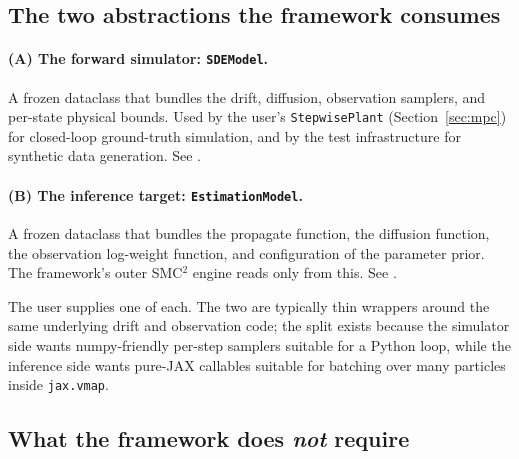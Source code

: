 \subsection{The two abstractions the framework consumes} \label{sec:interfaces}

\paragraph{(A) The forward simulator: \texttt{SDEModel}.}
A frozen dataclass that bundles the drift, diffusion, observation
samplers, and per-state physical bounds. Used by the user's
\texttt{StepwisePlant} (Section~\ref{sec:mpc}) for closed-loop
ground-truth simulation, and by the test infrastructure for synthetic
data generation. See .

\paragraph{(B) The inference target: \texttt{EstimationModel}.}
A frozen dataclass that bundles the propagate function, the diffusion
function, the observation log-weight function, and configuration of
the parameter prior. The framework's outer SMC$^2$ engine reads only
from this. See .

\bigskip
The user supplies one of each. The two are typically thin wrappers
around the same underlying drift and observation code; the split exists
because the simulator side wants numpy-friendly per-step samplers
suitable for a Python loop, while the inference side wants pure-JAX
callables suitable for batching over many particles inside
\texttt{jax.vmap}.

\subsection{What the framework does \emph{not} require}

